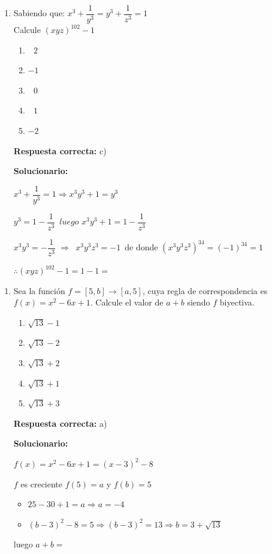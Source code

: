 \begin{enumerate}[resume]
	
	\item Sabiendo que:
	${x^3} + \dfrac{1}{{{y^3}}} = {y^3} + \dfrac{1}{{{z^3}}} = 1$\\
	Calcule $(xyz)^{102}-1$
	
	
	\begin{enumerate}[label=\alph*)]
		\item $\,\,\,\,2$
		\item $-1$
		\item $\,\,\,\,0$
		\item $\,\,\,\,1$
		\item $-2$
	\end{enumerate}
	
	\textbf{Respuesta correcta:} c)
	
	\vspace{2mm}
	\textbf{Solucionario:}
	
	${x^3} + \dfrac{1}{{{y^3}}} = 1 \Rightarrow {x^3}{y^3} + 1 = {y^3}$
	
	${y^3} = 1 - \dfrac{1}{{{z^3}}}\,\,\,luego\,\,{x^3}{y^3} + 1 = 1 - \dfrac{1}{{{z^3}}}$
	
	${x^3}{y^3} =  - \dfrac{1}{{{z^3}}}\,\, \Rightarrow \,\,\,{x^3}{y^3}{z^3} =  - 1$\	de donde ${\left( {{x^3}{y^3}{z^3}} \right)^{34}} = {\left( { - 1} \right)^{34}} = 1$
	
	$\therefore {(xyz)^{102}} - 1 = 1 - 1 =$
	
	
\end{enumerate}


\begin{enumerate}[resume]
	
	\item Sea la función $f = [5,b] \to [a,5]$, cuya regla de correspondencia es $f(x)=x^2-6x+1$. Calcule el valor de $a+b$ siendo $f$ biyectiva. 
	\begin{enumerate}[label=\alph*)]
		\item $\sqrt{13}-1$
		\item $\sqrt{13}-2$
		\item $\sqrt{13}+2$
		\item $\sqrt{13}+1$
		\item $\sqrt{13}+3$
	\end{enumerate}
	
	\textbf{Respuesta correcta:} a)
	
	\vspace{2mm}
	\textbf{Solucionario:}
	
	$f(x)=x^2-6x+1=(x-3)^2-8$
	
	$f$ es creciente $f(5)=a$ y $f(b)=5$
	
	\begin{itemize}[label=.]
		\item $25 - 30 + 1 = a\Rightarrow a =  - 4$
		\item $(b - 3)^2 - 8 = 5 \Rightarrow {(b - 3)^2} = 13 \Rightarrow b = 3 + \sqrt {13}$
	\end{itemize}
	
	luego $a+b=$
	
\end{enumerate}



